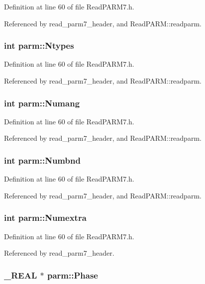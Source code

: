 Definition at line 60 of file Read\-PARM7.h.

Referenced by read\_\-parm7\_\-header, and Read\-PARM::readparm.
\subsubsection{\setlength{\rightskip}{0pt plus 5cm}int parm::Ntypes}\label{structparm_m5}




Definition at line 60 of file Read\-PARM7.h.

Referenced by read\_\-parm7\_\-header, and Read\-PARM::readparm.
\subsubsection{\setlength{\rightskip}{0pt plus 5cm}int parm::Numang}\label{structparm_m20}




Definition at line 60 of file Read\-PARM7.h.

Referenced by read\_\-parm7\_\-header, and Read\-PARM::readparm.
\subsubsection{\setlength{\rightskip}{0pt plus 5cm}int parm::Numbnd}\label{structparm_m19}




Definition at line 60 of file Read\-PARM7.h.

Referenced by read\_\-parm7\_\-header, and Read\-PARM::readparm.
\subsubsection{\setlength{\rightskip}{0pt plus 5cm}int parm::Numextra}\label{structparm_m99}




Definition at line 60 of file Read\-PARM7.h.

Referenced by read\_\-parm7\_\-header.
\subsubsection{\setlength{\rightskip}{0pt plus 5cm}\_\-REAL $\ast$ parm::Phase}\label{structparm_m44}




